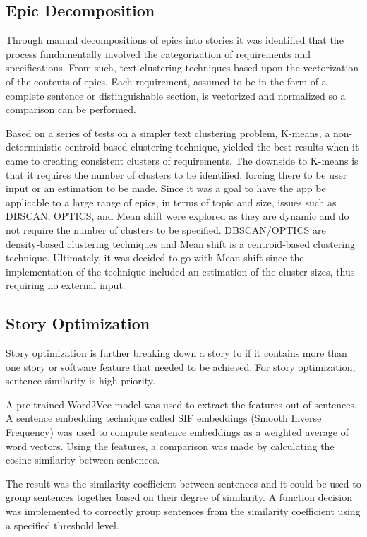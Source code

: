 \subsection{Epic Decomposition}
Through manual decompositions of epics into stories it was identified that the process fundamentally involved the categorization of requirements and specifications. From such, text clustering techniques based upon the vectorization of the contents of epics. Each requirement, assumed to be in the form of a complete sentence or distinguishable section, is vectorized and normalized so a comparison can be performed.

Based on a series of tests on a simpler text clustering problem, K-means, a non-deterministic centroid-based clustering technique, yielded the best results when it came to creating consistent clusters of requirements. The downside to K-means is that it requires the number of clusters to be identified, forcing there to be user input or an estimation to be made. Since it was a goal to have the app be applicable to a large range of epics, in terms of topic and size, issues such as DBSCAN, OPTICS, and Mean shift were explored as they are dynamic and do not require the number of clusters to be specified. DBSCAN/OPTICS are density-based clustering techniques and Mean shift is a centroid-based clustering technique. Ultimately, it was decided to go with Mean shift since the implementation of the technique included an estimation of the cluster sizes, thus requiring no external input.

\subsection{Story Optimization}
Story optimization is further breaking down a story to if it contains more than one story or software feature that needed to be achieved. For story optimization, sentence similarity is high priority. 

A pre-trained Word2Vec model was used to extract the features out of sentences. A sentence embedding technique called SIF embeddings (Smooth Inverse Frequency) was used to compute sentence embeddings as a weighted average of word vectors. Using the features, a comparison was made by calculating the cosine similarity between sentences. 

The result was the similarity coefficient between sentences and it could be used to group sentences together based on their degree of similarity. A function decision was implemented to correctly group sentences from the similarity coefficient using a specified threshold level. 

